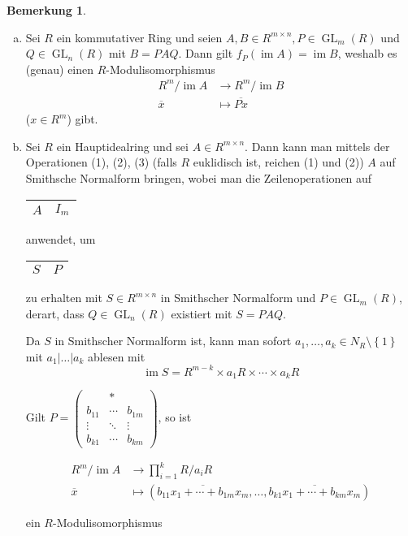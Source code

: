 \documentclass[
twoside=semi,
fontsize=12,
DIV=12, 
cleardoublepage=current,
leqno,
headings=optiontoheadandtoc, 
toc=idx
]{scrbook}
\newcommand{\set}[1]{\left\{ #1 \right\}}
\DeclareMathOperator{\im}{im}
\DeclareMathOperator{\GL}{GL}
\theoremstyle{definition}
\newtheorem{bemerkung}[definition]{Bemerkung}
\begin{document}
	\begin{bemerkung}\label{1.6.6}
		\begin{enumerate}[(a)]
			\item Sei $R$ ein kommutativer Ring und seien $A, B \in R^{m\times n}, P \in \GL_m(R)$ und $Q \in \GL_n(R)$ mit $B=PAQ$. Dann gilt $f_P(\im A) = \im B$, weshalb es (genau) einen $R$-Modulisomorphismus
			\begin{align*}
				R^m/\im A &\to R^m/\im B\\
				\overline{x} &\mapsto \overline{Px}
			\end{align*}
			($x \in R^m$) gibt.
			
			\item Sei $R$ ein Hauptidealring und sei $A \in R^{m\times n}$. Dann kann man mittels der Operationen (1), (2), (3) (falls $R$ euklidisch ist, reichen (1) und (2)) $A$ auf Smithsche Normalform bringen, wobei man die Zeilenoperationen auf \begin{tabular}{|c|c|}\hline
				$A$ & $I_m$\\\hline
			\end{tabular} anwendet, um \begin{tabular}{|c|c|}\hline
			$S$ & $P$\\\hline
			\end{tabular} zu erhalten mit $S \in R^{m \times n}$ in Smithscher Normalform und $P \in \GL_m(R)$, derart, dass $Q \in \GL_n(R)$ existiert mit $S=PAQ$.
		
			Da $S$ in Smithscher Normalform ist, kann man sofort $a_1, \dots, a_k \in N_R \setminus \set{1}$ mit $a_1|\dots|a_k$ ablesen mit
				\[\im S = R^{m-k} \times a_1R \times \cdots \times a_kR\]
				
			Gilt $P = \begin{pmatrix}
				&*&\\\hline b_{11} &\cdots& b_{1m}\\\vdots&\ddots&\vdots\\
				b_{k1} &\cdots & b_{km} 
			\end{pmatrix}$, so ist 
			
			\begin{align*}
				R^m/\im A &\to \prod_{i=1}^k R/a_iR\\
				\overline{x} &\mapsto (\overline{b_{11}x_1+\cdots+b_{1m}x_m}, \dots, \overline{b_{k1}x_1+\cdots+b_{km}x_m})
			\end{align*}
		
			ein $R$-Modulisomorphismus
		\end{enumerate}
	

\end{bemerkung}
\end{document}
